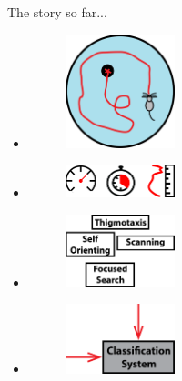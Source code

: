 \documentclass{beamer}
\newcommand{\nologo}{\setbeamertemplate{logo}{}} %
\begin{document}
{\nologo
\begin{frame}{The story so far...}
\begin{multicols}{2}
	\begin{itemize}
		\item<1->
		\begin{figure}[H]
			\centering
			\includegraphics[width=0.3\textwidth]{figures/MWM}
		\end{figure}
		\vspace{5mm}
		\item<2->
		\begin{figure}[H]
			\centering
			\includegraphics[width=0.3\textwidth]{figures/perfM}
		\end{figure}	
		\vspace{5mm}
		\item<3->
		\begin{figure}[H]
			\centering
			\includegraphics[width=0.3\textwidth]{figures/labels}
		\end{figure}	
		\vspace{4mm}
		\item<4->
		\begin{figure}[H]
			\centering
			\includegraphics[width=0.3\textwidth]{figures/classifier}
		\end{figure}		
	\end{itemize}
\end{multicols}	
\end{frame}

}
\end{document}
